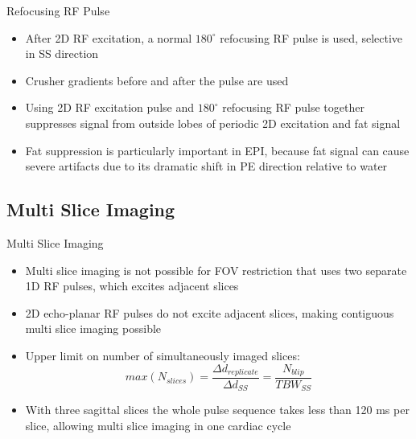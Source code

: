 \documentclass{beamer}
\begin{document}
\begin{frame}{Refocusing RF Pulse}
\begin{itemize}
	\item After 2D RF excitation, a normal $180^{\circ}$ refocusing RF pulse is used, selective in SS direction
	\item Crusher gradients before and after the pulse are used
	\item Using 2D RF excitation pulse and $180^{\circ}$ refocusing RF pulse together suppresses signal from outside lobes of periodic 2D excitation and fat signal
	\item Fat suppression is particularly important in EPI, because fat signal can cause severe artifacts due to its dramatic shift in PE direction relative to water
\end{itemize}
\end{frame}

\subsection{Multi Slice Imaging}

\begin{frame}{Multi Slice Imaging}
\begin{itemize}
	\item Multi slice imaging is not possible for FOV restriction that uses two separate 1D RF pulses, which excites adjacent slices
	\item 2D echo-planar RF pulses do not excite adjacent slices, making contiguous multi slice imaging possible
	\item Upper limit on number of simultaneously imaged slices: $$max\left(N_{slices}\right)=\frac{\Delta d_{replicate}}{\Delta d_{SS}}=\frac{N_{blip}}{TBW_{SS}}$$
	\item With three sagittal slices the whole pulse sequence takes less than 120 ms per slice, allowing multi slice imaging in one cardiac cycle
\end{itemize}
\end{frame}

\end{document}
